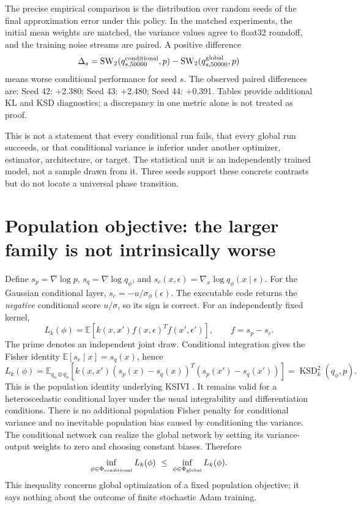 \documentclass[11pt,a4paper]{article}
\numberwithin{equation}{section}
\newcommand{\E}{\mathbb E}
\begin{document}
The precise empirical comparison is the distribution over random seeds of
the final approximation error under this policy. In the matched experiments,
the initial mean weights are matched, the variance values agree to float32
roundoff, and the training noise streams are paired. A positive difference
\[
 \Delta_s=\mathrm{SW}_2(q^{\rm conditional}_{s,50000},p)
              -\mathrm{SW}_2(q^{\rm global}_{s,50000},p)
\]
means worse conditional performance for seed $s$. The observed paired
differences are: Seed 42: +2.380; Seed 43: +2.480; Seed 44: +0.391. Tables provide additional KL and KSD
diagnostics; a discrepancy in one metric alone is not treated as proof.

This is not a statement that every conditional run fails, that every global
run succeeds, or that conditional variance is inferior under another optimizer,
estimator, architecture, or target. The statistical unit is an independently
trained model, not a sample drawn from it. Three seeds support these concrete
contrasts but do not locate a universal phase transition.

\section{Population objective: the larger family is not intrinsically worse}
Define $s_p=\nabla\log p$, $s_q=\nabla\log q_\phi$, and
$s_c(x,\epsilon)=\nabla_x\log q_\phi(x\mid\epsilon)$. For the Gaussian
conditional layer, $s_c=-u/\sigma_\phi(\epsilon)$. The executable code returns
the \emph{negative} conditional score $u/\sigma$, so its sign is correct.
For an independently fixed kernel,
\[
 L_k(\phi)=\E[k(x,x')f(x,\epsilon)^T f(x',\epsilon')],\qquad
 f=s_p-s_c.
\]
The prime denotes an independent joint draw. Conditional integration gives
the Fisher identity $\E[s_c\mid x]=s_q(x)$, hence
\[
 L_k(\phi)=\E_{q_\phi\otimes q_\phi}
  [k(x,x')(s_p(x)-s_q(x))^T(s_p(x')-s_q(x'))]
 =\operatorname{KSD}_k^2(q_\phi,p).
\]
This is the population identity underlying KSIVI \cite{cheng}. It remains
valid for a heteroscedastic conditional layer under the usual integrability
and differentiation conditions. There is no additional population Fisher
penalty for conditional variance and no inevitable population bias caused by
conditioning the variance. The conditional network can realize the global
network by setting its variance-output weights to zero and choosing constant
biases. Therefore
\[
 \inf_{\phi\in\Phi_{\rm conditional}}L_k(\phi)
 \ \leq\ \inf_{\phi\in\Phi_{\rm global}}L_k(\phi).
\]
This inequality concerns global optimization of a fixed population objective;
it says nothing about the outcome of finite stochastic Adam training.
\end{document}

